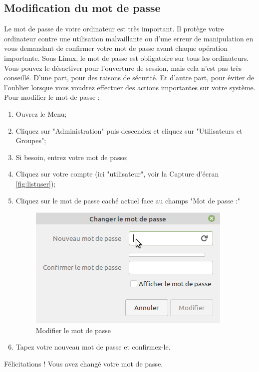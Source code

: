 \documentclass[12pt]{book}
\begin{document}
	\subsection{Modification du mot de passe}
		Le mot de passe de votre ordinateur est très important. 
		Il protège votre ordinateur contre une utilisation malvaillante ou d'une erreur de manipulation en vous demandant de confirmer votre mot de passe avant chaque opération importante.
		Sous Linux, le mot de passe est obligatoire sur tous les ordinateurs.
		Vous pouvez le désactiver pour l'ouverture de session, mais cela n'est pas très conseillé.
		D'une part, pour des raisons de sécurité.
		Et d'autre part, pour éviter de l'oublier lorsque vous voudrez effectuer des actions importantes sur votre système.
		Pour modifier le mot de passe :
		\begin{enumerate}
			\item Ouvrez le Menu;
			\item Cliquez sur "Administration" puis descendez et cliquez sur "Utilisateurs et Groupes";
			\item Si besoin, entrez votre mot de passe;
			\item Cliquez sur votre compte (ici "utilisateur", voir la Capture d'écran \ref{fig:listuser});
			\item Cliquez sur le mot de passe caché actuel face au champs "Mot de passe :"
			\begin{figure}[h]
				\centering
				\includegraphics[width=.5\textwidth]{include/mdpuser.png}
				\caption{Modifier le mot de passe}
				\label{fig:ndpuser}
			\end{figure}
			\item Tapez votre nouveau mot de passe et confirmez-le.
		\end{enumerate}
		Félicitations ! Vous avez changé votre mot de passe.
\end{document}
